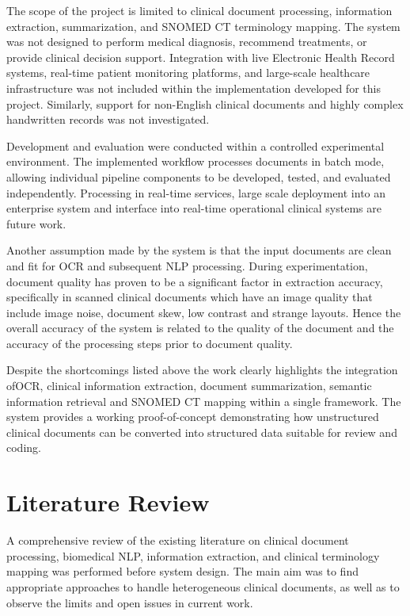 The scope of the project is limited to clinical document processing, information extraction, summarization, and SNOMED CT terminology mapping. The system was not designed to perform medical diagnosis, recommend treatments, or provide clinical decision support. Integration with live Electronic Health Record systems, real-time patient monitoring platforms, and large-scale healthcare infrastructure was not included within the implementation developed for this project. Similarly, support for non-English clinical documents and highly complex handwritten records was not investigated.

Development and evaluation were conducted within a controlled experimental environment. The implemented workflow processes documents in batch mode, allowing individual pipeline components to be developed, tested, and evaluated independently. Processing in real-time services, large scale deployment into an enterprise system and interface into real-time operational clinical systems are future work.

Another assumption made by the system is that the input documents are clean and fit for OCR and subsequent NLP processing. During experimentation, document quality has proven to be a significant factor in extraction accuracy, specifically in scanned clinical documents which have an image quality that include image noise, document skew, low contrast and strange layouts. Hence the overall accuracy of the system is related to the quality of the document and the accuracy of the processing steps prior to document quality.

Despite the shortcomings listed above the work clearly highlights the integration ofOCR, clinical information extraction, document summarization, semantic information retrieval and SNOMED CT mapping within a single framework. The system provides a working proof-of-concept demonstrating how unstructured clinical documents can be converted into structured data suitable for review and coding.

\section[Literature Review]{\textbf{Literature Review}}

A comprehensive review of the existing literature on clinical document processing, biomedical NLP, information extraction, and clinical terminology mapping was performed before system design. The main aim was to find appropriate approaches to handle heterogeneous clinical documents, as well as to observe the limits and open issues in current work.

